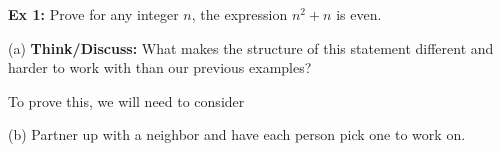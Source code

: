 \documentclass[fleqn]{article}
\theoremstyle{definition}
\begin{document}
\vspace{.25cm}
\noindent{}


\vspace{.25cm}

\textbf{Ex 1:} Prove for any integer $n$, the expression $n^2+n$ is even. 

\vspace{.25cm}
(a) \textbf{Think/Discuss:} What makes the structure of this statement different and harder to work with than our previous examples? 

\vspace{2cm}
To prove this, we will need to consider \underline{\hspace{2.5cm}}



\newpage

(b) Partner up with a neighbor and have each person pick one \underline{\hspace{2cm}} to work on. 
\end{document}
